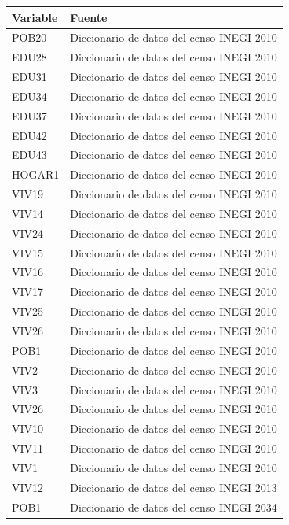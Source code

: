 \documentclass[paper=letter, fontsize=11pt]{scrartcl}
\numberwithin{equation}{section} %
\numberwithin{figure}{section} %
\numberwithin{table}{section} %
\begin{document}
\begin{enumerate}
\begin{enumerate}
\begin{table}[H]
\begin{tabular}{ll}
Variable   	&	   Fuente\\
     \hline		
POB20    	&	 Diccionario de datos del censo INEGI 2010 \\
EDU28  	&	     Diccionario de datos del censo INEGI 2010\\
EDU31 	&	 Diccionario de datos del censo INEGI 2010\\
EDU34 	&	 Diccionario de datos del censo INEGI 2010\\
EDU37 	&	     Diccionario de datos del censo INEGI 2010\\
EDU42 	&	 Diccionario de datos del censo INEGI 2010\\
EDU43 	&	     Diccionario de datos del censo INEGI 2010\\
HOGAR1 	&	     Diccionario de datos del censo INEGI 2010\\
VIV19 	&	     Diccionario de datos del censo INEGI 2010\\
VIV14 	&	 Diccionario de datos del censo INEGI 2010\\
VIV24 	&	 Diccionario de datos del censo INEGI 2010\\
VIV15    	&	             Diccionario de datos del censo INEGI 2010\\
VIV16    	&	     Diccionario de datos del censo INEGI 2010\\
VIV17    	&	      Diccionario de datos del censo INEGI 2010\\
VIV25    	&	       Diccionario de datos del censo INEGI 2010\\
VIV26    	&	           Diccionario de datos del censo INEGI 2010\\
POB1    	&	          Diccionario de datos del censo INEGI 2010\\
VIV2    	&	       Diccionario de datos del censo INEGI 2010\\
VIV3    	&	       Diccionario de datos del censo INEGI 2010\\
VIV26    	&	      Diccionario de datos del censo INEGI 2010\\
VIV10        	&	       Diccionario de datos del censo INEGI 2010\\
VIV11    	&	               Diccionario de datos del censo INEGI 2010\\
VIV1          	&	              Diccionario de datos del censo INEGI 2010\\
VIV12           	&	       Diccionario de datos del censo INEGI 2013\\
POB1          	&	       Diccionario de datos del censo INEGI 2034\\

\end{tabular}
\end{table}
\end{enumerate}
\end{enumerate}
\end{document}
